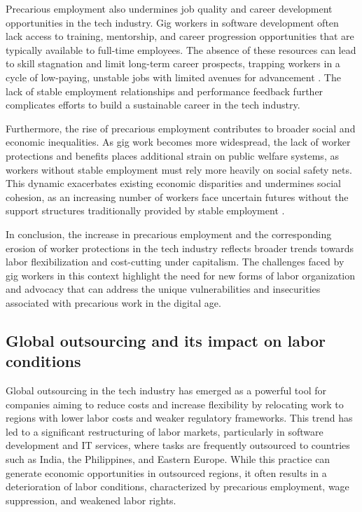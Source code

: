 \begin{refsection}
Precarious employment also undermines job quality and career development opportunities in the tech industry. Gig workers in software development often lack access to training, mentorship, and career progression opportunities that are typically available to full-time employees. The absence of these resources can lead to skill stagnation and limit long-term career prospects, trapping workers in a cycle of low-paying, unstable jobs with limited avenues for advancement \cite[pp.~209-212]{kalleberg2009precarious}. The lack of stable employment relationships and performance feedback further complicates efforts to build a sustainable career in the tech industry.

Furthermore, the rise of precarious employment contributes to broader social and economic inequalities. As gig work becomes more widespread, the lack of worker protections and benefits places additional strain on public welfare systems, as workers without stable employment must rely more heavily on social safety nets. This dynamic exacerbates existing economic disparities and undermines social cohesion, as an increasing number of workers face uncertain futures without the support structures traditionally provided by stable employment \cite[pp.~143-146]{lee2015working}.

In conclusion, the increase in precarious employment and the corresponding erosion of worker protections in the tech industry reflects broader trends towards labor flexibilization and cost-cutting under capitalism. The challenges faced by gig workers in this context highlight the need for new forms of labor organization and advocacy that can address the unique vulnerabilities and insecurities associated with precarious work in the digital age.

\subsection{Global outsourcing and its impact on labor conditions}

Global outsourcing in the tech industry has emerged as a powerful tool for companies aiming to reduce costs and increase flexibility by relocating work to regions with lower labor costs and weaker regulatory frameworks. This trend has led to a significant restructuring of labor markets, particularly in software development and IT services, where tasks are frequently outsourced to countries such as India, the Philippines, and Eastern Europe. While this practice can generate economic opportunities in outsourced regions, it often results in a deterioration of labor conditions, characterized by precarious employment, wage suppression, and weakened labor rights.


\end{refsection}
